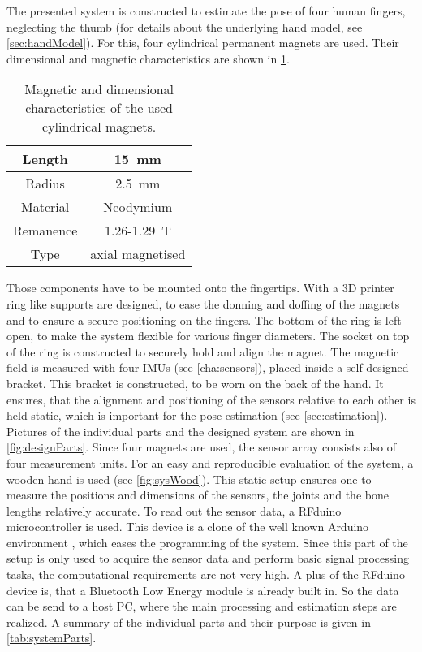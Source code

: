 The presented system is constructed to estimate the pose of four human fingers, neglecting the thumb (for details about the underlying hand model, see \ref{sec:handModel}). For this, four cylindrical permanent magnets are used. Their dimensional and magnetic characteristics are shown in \ref{tab:magDimensions}.
\begin{table}[h]
\centering
\begin{tabular}{|c|c|}
	\hline
	Length & \SI{15}{\mm} \\ \hline
	Radius & \SI{2.5}{\mm} \\ \hline
	Material & Neodymium \\ \hline
	Remanence & 1.26-\SI{1.29}{\tesla} \\ \hline
	Type & axial magnetised \\ \hline
\end{tabular}
\caption{Magnetic and dimensional characteristics of the used cylindrical magnets.}
\label{tab:magDimensions}
\end{table}
Those components have to be mounted onto the fingertips. With a 3D printer ring like supports are designed, to ease the donning and doffing of the magnets and to ensure a secure positioning on the fingers. The bottom of the ring is left open, to make the system flexible for various finger diameters. The socket on top of the ring is constructed to securely hold and align the magnet. The magnetic field is measured with four \acp{IMU} (see \ref{cha:sensors}), placed inside a self designed bracket. This bracket is constructed, to be worn on the back of the hand. It ensures, that the alignment and positioning of the sensors relative to each other is held static, which is important for the pose estimation (see \ref{sec:estimation}). Pictures of the individual parts and the designed system are shown in \ref{fig:designParts}. Since four magnets are used, the sensor array consists also of four measurement units. For an easy and reproducible evaluation of the system, a wooden hand is used (see \ref{fig:sysWood}). This static setup ensures one to measure the positions and dimensions of the sensors, the joints and the bone lengths relatively accurate. To read out the sensor data, a RFduino microcontroller \cite{rfduino2015data} is used. This device is a clone of the well known Arduino environment \cite{arduino}, which eases the programming of the system. Since this part of the setup is only used to acquire the sensor data and perform basic signal processing tasks, the computational requirements are not very high. A plus of the RFduino device is, that a Bluetooth Low Energy module is already built in. So the data can be send to a host PC, where the main processing and estimation steps are realized. A summary of the individual parts and their purpose is given in \ref{tab:systemParts}.

